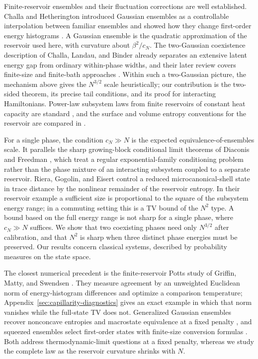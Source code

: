 Finite-reservoir ensembles and their fluctuation corrections are well
established. Challa and Hetherington introduced Gaussian ensembles as a
controllable interpolation between familiar ensembles and showed how
they change first-order energy histograms
\cite{ChallaHetherington1988PRL,ChallaHetherington1988PRA}. A Gaussian
ensemble is the quadratic approximation of the reservoir used here,
with curvature about $\beta^2/c_N$. The two-Gaussian coexistence
description of Challa, Landau, and Binder \cite{ChallaLandauBinder1986}
already separates an extensive latent energy gap from ordinary
within-phase widths, and their later review covers finite-size and
finite-bath approaches \cite{ChallaLandauBinder1990}. Within such a
two-Gaussian picture, the mechanism above gives the $N^{3/2}$ scale
heuristically; our contribution is the two-sided theorem, its precise
tail conditions, and its proof for interacting Hamiltonians.
Power-law subsystem laws from finite reservoirs of constant heat capacity are standard
\cite{Campisi2007}, and the surface and volume entropy conventions for
the reservoir are compared in
\cite{HilbertHanggiDunkel2014,DunkelHilbert2014}.

For a single phase, the condition $c_N\gg N$ is the expected
equivalence-of-ensembles scale. It parallels the sharp growing-block
conditional limit theorems of Diaconis and Freedman
\cite{DiaconisFreedman1988}, which treat a regular exponential-family
conditioning problem rather than the phase mixture of an interacting
subsystem coupled to a separate reservoir. Riera, Gogolin, and Eisert
\cite{RieraGogolinEisert2012} control a reduced microcanonical-shell
state in trace distance by the nonlinear remainder of the reservoir
entropy. In their reservoir example a sufficient size is proportional
to the square of the subsystem energy range; in a commuting setting
this is a TV bound of the $N^2$ type. A bound based on the full energy
range is not sharp for a single phase, where $c_N\gg N$ suffices. We
show that two coexisting phases need only $N^{3/2}$ after calibration, and that $N^2$
is sharp when three distinct phase energies must be preserved. Our
results concern classical systems, described by probability measures on
the state space.

The closest numerical precedent is the finite-reservoir Potts study of
Griffin, Matty, and Swendsen \cite{GriffinMattySwendsen2017}. They
measure agreement by an unweighted Euclidean norm of energy-histogram
differences and optimize a comparison temperature;
Appendix~\ref{sec:capillarity-diagnostics} gives an exact example in
which that norm vanishes while the full-state TV does not. Generalized
Gaussian ensembles recover nonconcave entropies and macrostate
equivalence at a fixed penalty
\cite{CosteniucEllisTouchette2006,CosteniucEllisTouchetteTurkington2005},
and squeezed ensembles select first-order states with finite-size
conversion formulas \cite{YonetaShimizu2019}. Both address
thermodynamic-limit questions at a fixed penalty, whereas we study the
complete law as the reservoir curvature shrinks with $N$.

